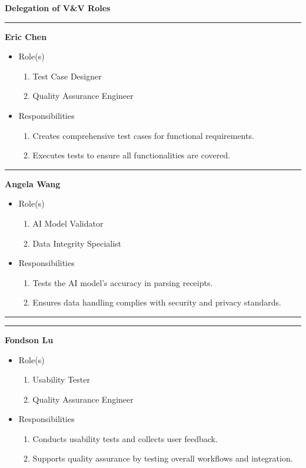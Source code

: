 \documentclass[12pt, titlepage]{article}
\begin{document}
\noindent \textbf{Delegation of V\&V Roles} \\

\hrule
\vspace{10pt}

\textbf{Eric Chen}
\begin{itemize}
	\item Role(s)
	\begin{enumerate}
		\item Test Case Designer
		\item Quality Assurance Engineer
	\end{enumerate}
	\item Responsibilities
	\begin{enumerate}
		\item Creates comprehensive test cases for functional requirements.
		\item Executes tests to ensure all functionalities are covered.
	\end{enumerate}
\end{itemize}

\hrule
\vspace{10pt}

\textbf{Angela Wang}
\begin{itemize}
	\item Role(s)
	\begin{enumerate}
		\item AI Model Validator
		\item Data Integrity Specialist
	\end{enumerate}
	\item Responsibilities
	\begin{enumerate}
		\item Tests the AI model's accuracy in parsing receipts.
		\item Ensures data handling complies with security and privacy standards.
	\end{enumerate}
\end{itemize}

\hrule
\vspace{10pt}

\newpage

\hrule
\vspace{10pt}
\textbf{Fondson Lu}
\begin{itemize}
	\item Role(s)
	\begin{enumerate}
		\item Usability Tester
		\item Quality Assurance Engineer
	\end{enumerate}
	\item Responsibilities
	\begin{enumerate}
		\item Conducts usability tests and collects user feedback.
		\item Supports quality assurance by testing overall workflows and integration.
	\end{enumerate}
\end{itemize}
\end{document}

